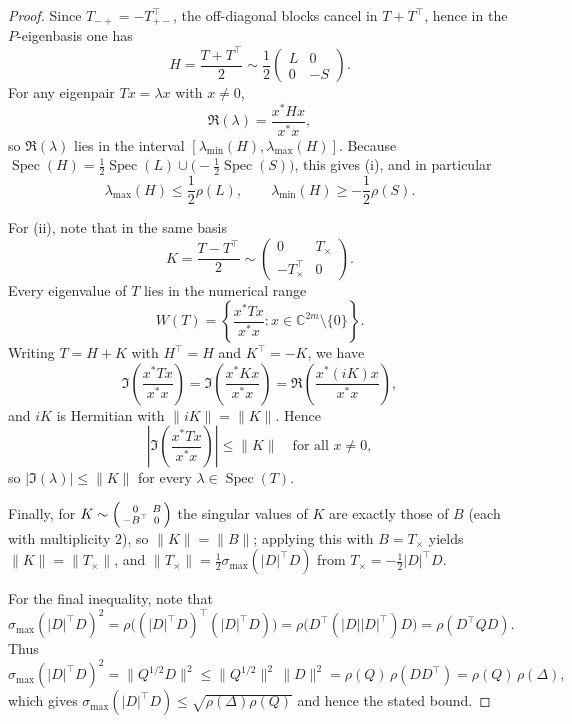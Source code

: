 \documentclass[11pt]{article}
\begin{document}
\begin{proof}
Since $T_{-+}=-T_{+-}^\top$, the off-diagonal blocks cancel in $T+T^\top$, hence in the
$P$-eigenbasis one has
\[
H=\frac{T+T^\top}{2}\sim
\frac12
\begin{pmatrix}
L & 0\\
0 & -S
\end{pmatrix}.
\]
For any eigenpair $Tx=\lambda x$ with $x\neq0$,
\[
\Re(\lambda)=\frac{x^* Hx}{x^* x},
\]
so $\Re(\lambda)$ lies in the interval $[\lambda_{\min}(H),\lambda_{\max}(H)]$.
Because $\operatorname{Spec}(H)=\frac12\operatorname{Spec}(L)\cup\bigl(-\frac12\operatorname{Spec}(S)\bigr)$,
this gives (i), and in particular
\[
\lambda_{\max}(H)\le \frac12\rho(L),\qquad \lambda_{\min}(H)\ge -\frac12\rho(S).
\]

For (ii), note that in the same basis
\[
K=\frac{T-T^\top}{2}\sim
\begin{pmatrix}
0 & T_\times\\
- T_\times^\top & 0
\end{pmatrix}.
\]
Every eigenvalue of $T$ lies in the numerical range
\[
W(T)=\left\{\frac{x^*Tx}{x^*x}:x\in\mathbb{C}^{2m}\setminus\{0\}\right\}.
\]
Writing $T=H+K$ with $H^\top=H$ and $K^\top=-K$, we have
\[
\Im\!\left(\frac{x^*Tx}{x^*x}\right)=
\Im\!\left(\frac{x^*Kx}{x^*x}\right)
=
\Re\!\left(\frac{x^*(iK)x}{x^*x}\right),
\]
and $iK$ is Hermitian with $\|iK\|=\|K\|$. Hence
\[
\left|\Im\!\left(\frac{x^*Tx}{x^*x}\right)\right|
\le \|K\|
\quad\text{for all }x\neq0,
\]
so $|\Im(\lambda)|\le\|K\|$ for every $\lambda\in\operatorname{Spec}(T)$.

Finally, for $K\sim\begin{psmallmatrix}0&B\\-B^\top&0\end{psmallmatrix}$ the singular values of $K$
are exactly those of $B$ (each with multiplicity $2$), so $\|K\|=\|B\|$; applying this with
$B=T_\times$ yields $\|K\|=\|T_\times\|$, and $\|T_\times\|=\frac12\sigma_{\max}(|D|^\top D)$ from
$T_\times=-\frac12|D|^\top D$.

For the final inequality, note that
\[
\sigma_{\max}(|D|^\top D)^2=\rho\bigl((|D|^\top D)^\top(|D|^\top D)\bigr)
=\rho\bigl(D^\top(|D||D|^\top)D\bigr)=\rho(D^\top Q D).
\]
Thus
\[
\sigma_{\max}(|D|^\top D)^2=\|Q^{1/2}D\|^2\le \|Q^{1/2}\|^2\,\|D\|^2
=\rho(Q)\,\rho(DD^\top)=\rho(Q)\,\rho(\Delta),
\]
which gives $\sigma_{\max}(|D|^\top D)\le \sqrt{\rho(\Delta)\rho(Q)}$ and hence the stated bound.
\end{proof}
\end{document}

